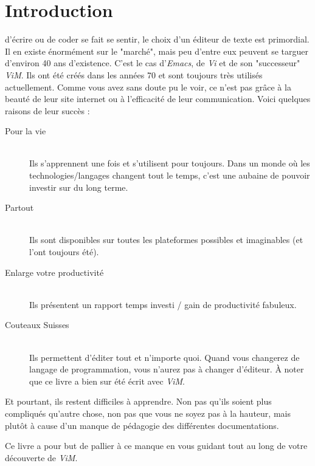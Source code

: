 \chapter*{Introduction}

 d'écrire ou de coder se fait se sentir, le choix d'un éditeur de texte est primordial. Il en existe énormément sur le "marché", mais peu d'entre eux peuvent se targuer d'environ 40 ans d'existence. C'est le cas d'\emph{Emacs}, de \emph{Vi} et de son "successeur" \emph{ViM}. Ils ont été créés dans les années 70 et sont toujours très utilisés actuellement. Comme vous avez sans doute pu le voir, ce n'est pas grâce à la beauté de leur site internet ou à l'efficacité de leur communication. Voici quelques raisons de leur succès :

\begin{description}
    \item[Pour la vie] \hfill \\ Ils s'apprennent une fois et s'utilisent pour toujours. Dans un monde où les technologies/langages changent tout le temps, c'est une aubaine de pouvoir investir sur du long terme.
    \item[Partout] \hfill \\ Ils sont disponibles sur toutes les plateformes possibles et imaginables (et l'ont toujours été).
    \item[Enlarge votre productivité] \hfill \\ Ils présentent un rapport temps investi / gain de productivité fabuleux.
    \item[Couteaux Suisses] \hfill \\ Ils permettent d'éditer tout et n'importe quoi. Quand vous changerez de langage de programmation, vous n'aurez pas à changer d'éditeur. À noter que ce livre a bien sur été écrit avec \emph{ViM}.
\end{description}

Et pourtant, ils restent difficiles à apprendre. Non pas qu'ils soient plus compliqués qu'autre chose, non pas que vous ne soyez pas à la hauteur, mais plutôt à cause d'un manque de pédagogie des différentes documentations.

Ce livre a pour but de pallier à ce manque en vous guidant tout au long de votre découverte de \emph{ViM}.

